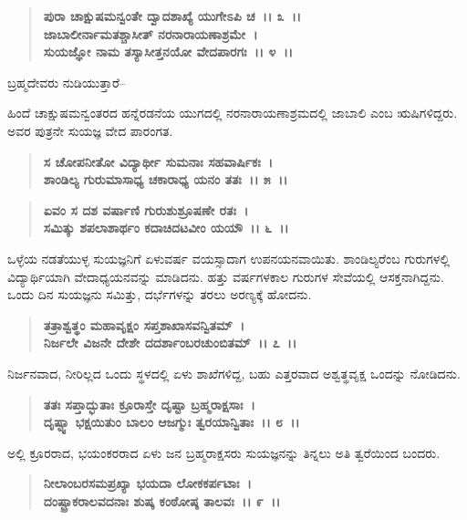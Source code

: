 \begin{verse}
\textbf{ಪುರಾ ಚಾಕ್ಷುಷಮನ್ವಂತೇ ದ್ವಾದಶಾಖ್ಯೆ ಯುಗೇಽಪಿ ಚ~।। ೩~।।}\\\textbf{ಜಾಬಾಲೀರ್ನಾಮತಶ್ಚಾಸೀತ್ ನರನಾರಾಯಣಾಶ್ರಮೇ~।}\\\textbf{ಸುಯಜ್ಞೋ ನಾಮ ತಸ್ಯಾಸೀತ್ತನಯೋ ವೇದಪಾರಗಃ~।। ೪~।।}
\end{verse}

\begin{flushleft}
ಬ್ರಹ್ಮದೇವರು ನುಡಿಯುತ್ತಾರೆ–
\end{flushleft}

ಹಿಂದೆ ಚಾಕ್ಷುಷಮನ್ವಂತರದ ಹನ್ನೆರಡನೆಯ ಯುಗದಲ್ಲಿ ನರನಾರಾಯಣಾಶ್ರಮದಲ್ಲಿ ಜಾಬಾಲಿ ಎಂಬ ಋಷಿಗಳಿದ್ದರು. ಅವರ ಪುತ್ರನೇ ಸುಯಜ್ಞ ವೇದ ಪಾರಂಗತ.

\begin{verse}
\textbf{ಸ ಚೋಪನೀತೋ ವಿದ್ಯಾರ್ಥೀ ಸುಮನಾಃ ಸಹವಾರ್ಷಿಕಃ~।}\\\textbf{ಶಾಂಡಿಲ್ಯ ಗುರುಮಾಸಾಧ್ಯ ಚಕಾರಾಧ್ಯ ಯನಂ ತತಃ~।। ೫~।। }
\end{verse}

\begin{verse}
\textbf{ಏವಂ ಸ ದಶ ವರ್ಷಾಣಿ ಗುರುಶುಶ್ರೂಷಣೇ ರತಃ~।}\\\textbf{ಸಮಿತ್ಕು ಶಪಲಾಶಾರ್ಥಂ ಕದಾಚಿದಟವೀಂ ಯಯೌ~।। ೬~।।}
\end{verse}

ಒಳ್ಳೆಯ ನಡತೆಯುಳ್ಳ ಸುಯಜ್ಞನಿಗೆ ಏಳುವರ್ಷ ವಯಸ್ಸಾದಾಗ ಉಪನಯನ\-ವಾಯಿತು. ಶಾಂಡಿಲ್ಯರೆಂಬ ಗುರುಗಳಲ್ಲಿ ವಿದ್ಯಾರ್ಥಿಯಾಗಿ ವೇದಾಧ್ಯಯನವನ್ನು ಮಾಡಿದನು. ಹತ್ತು ವರ್ಷಗಳಕಾಲ ಗುರುಗಳ ಸೇವೆಯಲ್ಲಿ ಆಸಕ್ತನಾಗಿದ್ದನು. ಒಂದು ದಿನ ಸುಯಜ್ಞನು ಸಮಿತ್ತು, ದರ್ಭೆಗಳನ್ನು ತರಲು ಅರಣ್ಯಕ್ಕೆ ಹೋದನು.

\begin{verse}
\textbf{ತತ್ರಾಶ್ವತ್ಥಂ ಮಹಾವೃಕ್ಷಂ ಸಪ್ತಶಾಖಾಸವನ್ವಿತಮ್~।}\\\textbf{ನಿರ್ಜಲೇ ವಿಜನೇ ದೇಶೇ ದದರ್ಶಾಂಬರಚುಂಬಿತಮ್~।। ೭~।।}
\end{verse}

ನಿರ್ಜನವಾದ, ನೀರಿಲ್ಲದ ಒಂದು ಸ್ಥಳದಲ್ಲಿ ಏಳು ಶಾಖೆಗಳಿದ್ದ, ಬಹು ಎತ್ತರವಾದ ಅಶ್ವತ್ಥವೃಕ್ಷ ಒಂದನ್ನು ನೋಡಿದನು.

\begin{verse}
\textbf{ತತಃ ಸಪ್ತಾದ್ಭುತಾಃ ಕ್ರೂರಾಸ್ತೇ ದೃಷ್ಟಾ ಬ್ರಹ್ಮರಾಕ್ಷಸಾಃ~।}\\\textbf{ದೃಷ್ಟ್ವಾ ಭಕ್ಷಯಿತುಂ ಬಾಲಂ ಆಜಗ್ಮುಃ ತ್ವರಯಾನ್ವಿತಾಃ~।। ೮~।।}
\end{verse}

ಅಲ್ಲಿ ಕ್ರೂರರಾದ, ಭಯಂಕರರಾದ ಏಳು ಜನ ಬ್ರಹ್ಮರಾಕ್ಷಸರು ಸುಯಜ್ಞನನ್ನು ತಿನ್ನಲು ಅತಿ ತ್ವರೆಯಿಂದ ಬಂದರು.

\begin{verse}
\textbf{ನೀಲಾಂಬರಸಮಪ್ರಖ್ಯಾ ಭಯದಾ ಲೋಕಕರ್ಪಟಾಃ~।}\\\textbf{ದಂಷ್ಟ್ರಾಕರಾಲವದನಾಃ ಶುಷ್ಕ ಕಂಠೋಷ್ಠ ತಾಲವಃ~।। ೯~।।} 
\end{verse}

